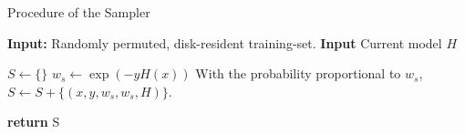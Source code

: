 \begin{algorithm}[H]

\caption{Procedure of the Sampler}\label{alg-sampler}


\begin{algorithmic}[0]



\State \textbf{Input:} Randomly permuted, disk-resident training-set.
\State \textbf{Input} \textrm{Current model} $H$

\State $S \gets \{\}$
	\State $w_s \gets \exp{( -y H(x) )}$
	\State \textrm{With the probability proportional to } $w_s$, \\
	\hspace{1.5cm} $S \gets S + \{( x, y, w_s, w_s, H )\}$.
\EndFor

\State \textbf{return } S

\EndFunction

\end{algorithmic}


\end{algorithm}










